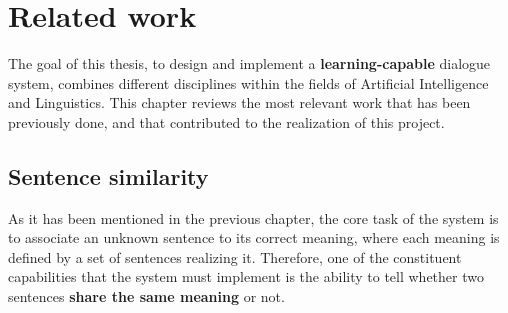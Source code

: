 
\chapter{Related work} %

\label{ch:rw} %


The goal of this thesis, to design and implement a \textbf{learning-capable} dialogue system, combines different disciplines within the fields of Artificial Intelligence and Linguistics. This chapter reviews the most relevant work that has been previously done, and that contributed to the realization of this project.


\section{Sentence similarity}
As it has been mentioned in the previous chapter, the core task of the system is to associate an unknown sentence to its correct meaning, where each meaning is defined by a set of sentences realizing it. Therefore, one of the constituent capabilities that the system must implement is the ability to tell whether two sentences \textbf{share the same meaning} or not.

